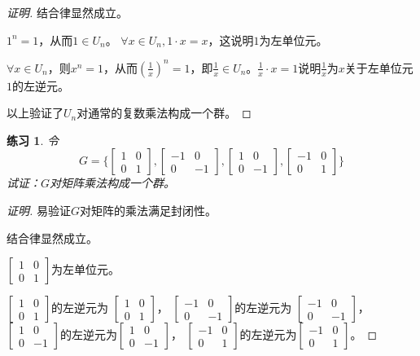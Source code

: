 \documentclass{article}
\newtheorem{Exercise}{练习}
\begin{document}
\begin{CJK*}{UTF8}{gbsn}
\begin{proof}[证明]
  结合律显然成立。

  $1^n=1$，从而$1\in U_n$。 $\forall x\in U_n, 1\cdot x = x$，这说明$1$为左单位元。

  $\forall x\in U_n$，则$x^n=1$，从而$(\frac{1}{x})^n=1$，即$\frac{1}{x}\in U_n$。$\frac{1}{x}\cdot x =1$说明$\frac{1}{x}$为$x$关于左单位元$1$的左逆元。

  以上验证了$U_n$对通常的复数乘法构成一个群。
\end{proof}

\begin{Exercise}
 令
 \[G=\bigg\{\begin{bmatrix}
  1&0\\0&1
 \end{bmatrix},
 \begin{bmatrix}
  -1&0\\0&-1
 \end{bmatrix},
 \begin{bmatrix}
  1&0\\0&-1
 \end{bmatrix},
 \begin{bmatrix}
  -1&0\\0&1
 \end{bmatrix}\bigg\}\] 
 试证：$G$对矩阵乘法构成一个群。
\end{Exercise}

\begin{proof}[证明]
  易验证$G$对矩阵的乘法满足封闭性。

  结合律显然成立。

  $\begin{bmatrix}
    1&0\\0&1
   \end{bmatrix}$为左单位元。

   $\begin{bmatrix}
    1&0\\0&1
   \end{bmatrix}$的左逆元为
   $\begin{bmatrix}
    1&0\\0&1
   \end{bmatrix}$，
   $\begin{bmatrix}
    -1&0\\0&-1
   \end{bmatrix}$的左逆元为
   $\begin{bmatrix}
    -1&0\\0&-1
   \end{bmatrix}$，
   $\begin{bmatrix}
    1&0\\0&-1
   \end{bmatrix}$的左逆元为$\begin{bmatrix}
    1&0\\0&-1
   \end{bmatrix}$，
   $\begin{bmatrix}
    -1&0\\0&1
   \end{bmatrix}$的左逆元为$\begin{bmatrix}
    -1&0\\0&1
   \end{bmatrix}$。


\end{proof}
\end{CJK*}
\end{document}
